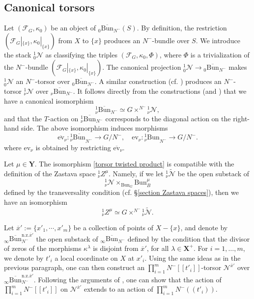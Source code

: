 \documentclass[11pt]{amsart}
\theoremstyle{plain}
\theoremstyle{remark}
\numberwithin{equation}{section}
\begin{document}
	\subsection{Canonical torsors}\label{section torsors}
	Let $(\mathcal{F}_G,\kappa_0)$ be an object of $_0\overline{\mathrm{Bun}}_{N^-}(S)$. By definition, the restriction $(\mathcal{F}_G|_{\{x\}},\kappa_0|_{\{x\}})$ from $X$ to $\{x\}$ produces an $N^-$-bundle over $S$.  We introduce the stack $_0^1\mathcal{N}$ as classifying the triples $(\mathcal{F}_G,\kappa_0,\Phi)$, where $\Phi$ is a trivialization of the $N^-$-bundle  $(\mathcal{F}_G|_{\{x\}},\kappa_0|_{\{x\}})$. The canonical projection $^1_0\mathcal{N}\to {_0\overline{\mathrm{Bun}}_{N^-}}$ makes $^1_0\mathcal{N}$ an $N^-$-torsor over $_0\overline{\mathrm{Bun}}_{N^-}$. A similar construction (cf. \cite[§3.2.6]{FGV}) produces an $N^-$-torsor $^1_\nu\mathcal{N}$ over $_\nu\overline{\mathrm{Bun}}_{N^-}$. It follows directly from the constructions (and \cite[(27)]{ABBGM}) that we have a canonical isomorphism
	\begin{equation}\label{torsor twisted product}
		^1_\nu\overline{\mathrm{Bun}}_{N^-}\simeq G\times^{N^-}{^1_\nu\mathcal{N}}, 
	\end{equation}
 and that the $T$-action on $^1_\nu\overline{\mathrm{Bun}}_{N^-}$ corresponds to the diagonal action on the right-hand side. The above isomorphism induces morphisms
	\begin{equation}\label{evaluation map}
		\overline{\mathrm{ev}}_\nu:{^1_\nu\overline{\mathrm{Bun}}}_{N^-}\to G/N^{-},\quad \mathrm{ev}_\nu:{^1_\nu\mathrm{Bun}}_{N^-}\to G/N^{-}. 
	\end{equation}
where $\mathrm{ev}_\nu$ is obtained by restricting $\overline{\mathrm{ev}}_\nu$. 
 
 Let $\mu\in\mathbf{Y}$. The isomorphism \eqref{torsor twisted product} is compatible with the definition of the Zastava space $^1_{\nu} Z^\mu$. Namely, if we let $^1_\nu\widetilde{\mathcal{N}}$ be the open substack of
	$$^1_\nu\mathcal{N}\times_{\mathrm{Bun}_G}\mathrm{Bun}_B^\mu$$
	defined by the transversality condition (cf. §\ref{section Zastava spaces}), then we have an isomorphism
	\begin{equation}\label{torsor twisted product zastava}
		^1_{\nu} Z^\mu\simeq G\times^{N^-}{^1_\nu\widetilde{\mathcal{N}}}.
	\end{equation}
	
	Let $\overline{x}':=\{x'_1,\cdots,x'_m\}$ be a collection of points of $X-\{x\}$, and denote by $_\infty\overline{\mathrm{Bun}}_{N^-}^{\mathrm{n.z.}\overline{x}'}$ the open substack of $_\infty\overline{\mathrm{Bun}}_{N^-}$ defined by the condition that the divisor of zeros of the morphisms $\kappa^\lambda$ is disjoint from $\overline{x}'$, for all $\lambda\in \mathbf{X}^+$. For $i=1,\dots,m$, we denote by $t'_i$ a local coordinate on $X$ at $x'_i$. Using the same ideas as in the previous paragraph, one can then construct an $\prod_{i=1}^mN^-[[t'_i]]$-torsor $\mathcal{N}^{\overline{x}'}$ over  $_\infty\overline{\mathrm{Bun}}_{N^-}^{\mathrm{n.z.}\overline{x}'}$. Following the arguments of \cite[Lemma 3.2.7]{FGV}, one can show that the action of $\prod_{i=1}^mN^-[[t'_i]]$ on $\mathcal{N}^{\overline{x}'}$ extends to an action of $\prod_{i=1}^mN^-((t'_i))$.
	
\end{document}
